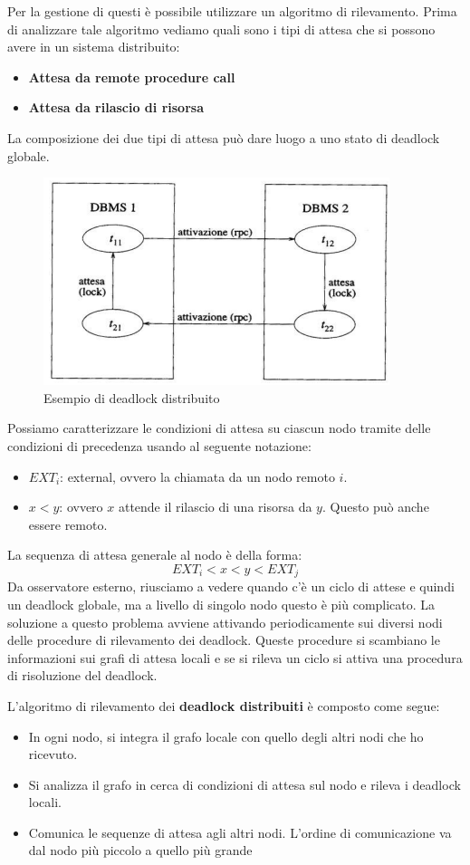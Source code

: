 Per la gestione di questi è possibile utilizzare un algoritmo di rilevamento.
Prima di analizzare tale algoritmo vediamo quali sono i tipi di attesa che
si possono avere in un sistema distribuito:
\begin{itemize}
      \item \textbf{Attesa da remote procedure call}
      \item \textbf{Attesa da rilascio di risorsa}
\end{itemize}
La composizione dei due tipi di attesa può dare luogo a uno stato di deadlock
globale.
\begin{figure}[!ht]
      \centering
      \includegraphics[width=.5\textwidth]{img/DDBMS/deadlock_distribuito.png}
      \caption{Esempio di deadlock distribuito}
      \label{fig:deadlock_distribuito}
\end{figure}

Possiamo caratterizzare le condizioni di attesa su ciascun nodo tramite delle
condizioni di precedenza usando al seguente notazione:
\begin{itemize}
      \item \textbf{$EXT_i$}: external, ovvero la chiamata da un nodo remoto $i$.
      \item $x < y$: ovvero $x$ attende il rilascio di una risorsa da $y$. Questo
            può anche essere remoto.
\end{itemize}
La sequenza di attesa generale al nodo è della forma:
\begin{equation*}
      EXT_i < x < y < EXT_j
\end{equation*}
Da osservatore esterno, riusciamo a vedere quando c'è un ciclo di attese e
quindi un deadlock globale, ma a livello di singolo nodo questo è più complicato.
La soluzione a questo problema avviene attivando periodicamente sui diversi nodi
delle procedure di rilevamento dei deadlock. Queste procedure si scambiano le
informazioni sui grafi di attesa locali e se si rileva un ciclo si attiva una
procedura di risoluzione del deadlock.

L'algoritmo di rilevamento dei \textbf{deadlock distribuiti} è composto come segue:
\begin{itemize}
      \item In ogni nodo, si integra il grafo locale con quello degli altri nodi
            che ho ricevuto.
      \item Si analizza il grafo in cerca di condizioni di attesa sul nodo e
            rileva i deadlock locali.
      \item Comunica le sequenze di attesa agli altri nodi. L'ordine di
            comunicazione va dal nodo più piccolo a quello più grande
\end{itemize}

